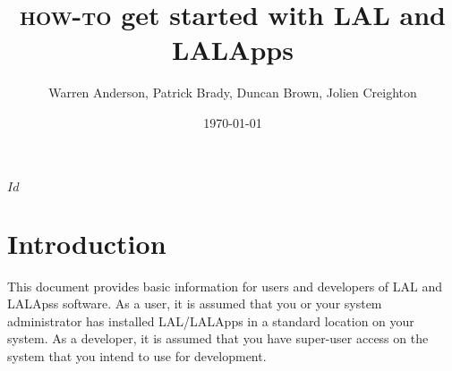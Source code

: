\documentclass[11pt]{ligodcc}
\begin{document}
\date{\today}
\title{\textsc{how-to} get started with LAL and LALApps}
\author{Warren Anderson, Patrick Brady, Duncan Brown, Jolien Creighton}
\rcsid$Id$
\maketitle

\tableofcontents
\pagebreak
\color{black}

\section{Introduction}

This document provides basic information for users and developers of
LAL and LALApss software.   As a user,  it is assumed that you or your
system administrator has installed LAL/LALApps in a standard location
on your system.   As a developer,  it is assumed that you have
super-user access on the system that you intend to use for
development.   

\clearpage

\end{document}
